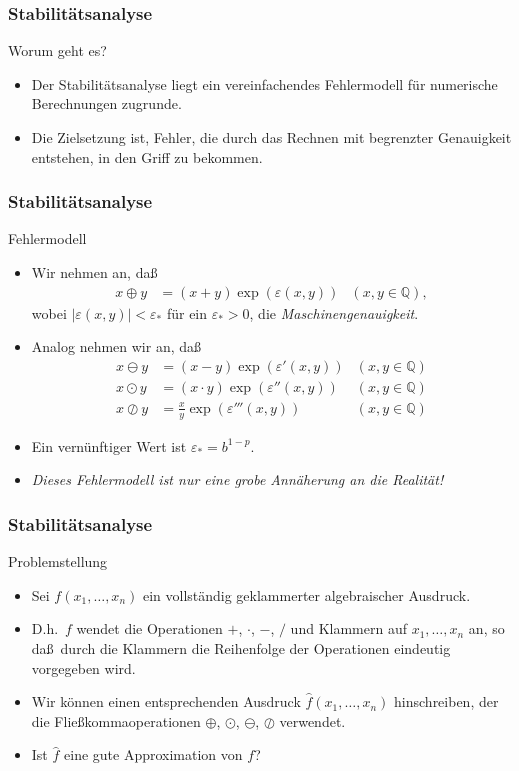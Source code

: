 \documentclass{beamer}
\title[Annuma]{\mytitle}
\author[Amin Coja-Oghlan]{Amin Coja-Oghlan}
\institute[Frankfurt]{JWGUFFM}
\date{}
\renewcommand{\emph}[1]{{\textcolor{solarizedRed}{\itshape #1}}}
\newcommand\QQ{\mathbb Q}
\newcommand{\eps}{\varepsilon}
\renewcommand{\ae}{\"a}
\newcommand{\ue}{\"u}
\newcommand{\mytitle}{Stabilit\ae tsanalyse}
\begin{document}
\frame[plain]{\titlepage}

\begin{frame}\frametitle{\mytitle}
	\begin{block}{Worum geht es?}
		\begin{itemize}
			\item Der Stabilit\ae tsanalyse liegt ein vereinfachendes Fehlermodell f\ue r numerische Berechnungen zugrunde.
			\item Die Zielsetzung ist, Fehler, die durch das Rechnen mit begrenzter Genauigkeit entstehen, in den Griff zu bekommen.
		\end{itemize}
	\end{block}
\end{frame}

\begin{frame}\frametitle{\mytitle}
	\begin{block}{Fehlermodell}
		\begin{itemize}
			\item Wir nehmen an, da\ss\
				\begin{align*}
					x\oplus y&=(x+y)\exp(\eps(x,y))&(x,y\in\QQ),
				\end{align*}
				wobei $|\eps(x,y)|<\eps_*$ f\ue r ein $\eps_*>0$, die \emph{Maschinengenauigkeit}.
			\item Analog nehmen wir an, da\ss\
				\begin{align*}
					x\ominus y&=(x-y)\exp(\eps'(x,y))&(x,y\in\QQ)\\
					x\odot y&=(x\cdot y)\exp(\eps''(x,y))&(x,y\in\QQ)\\
					x\oslash y&=\frac xy\exp(\eps'''(x,y))&(x,y\in\QQ)
				\end{align*}
			\item Ein vern\ue nftiger Wert ist $\eps_*=b^{1-p}$.
			\item \itshape Dieses Fehlermodell ist nur eine grobe Ann\ae herung an die Realit\ae t!
		\end{itemize}
	\end{block}
\end{frame}

\begin{frame}\frametitle{\mytitle}
	\begin{block}{Problemstellung}
		\begin{itemize}
			\item Sei $f(x_1,\ldots,x_n)$ ein vollst\"andig geklammerter algebraischer Ausdruck.
			\item D.h.\ $f$ wendet die Operationen $+$, $\cdot$, $-$, $/$ und Klammern auf $x_1,\ldots,x_n$ an, so da\ss\ durch die Klammern die Reihenfolge der Operationen eindeutig vorgegeben wird.
			\item Wir k\"onnen einen entsprechenden Ausdruck $\hat f(x_1,\ldots,x_n)$ hinschreiben, der die Flie\ss kommaoperationen $\oplus$, $\odot$, $\ominus$, $\oslash$ verwendet.
			\item Ist $\hat f$ eine gute Approximation von $f$?
		\end{itemize}
	\end{block}
\end{frame}
\end{document}
